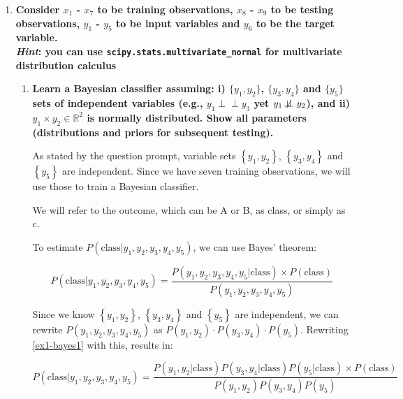 \documentclass[12pt]{article}
\newcommand{\ind}{\perp\!\!\!\perp}
\begin{document}
\begin{enumerate}[leftmargin=\labelsep]
  \item \textbf{Consider $x_1$ - $x_7$ to be training observations, $x_8$ - $x_9$ to be testing observations, $y_1$ - $y_5$ to be input
          variables and $y_6$ to be the target variable.\\
          \textit{Hint}: you can use \texttt{scipy.stats.multivariate\_normal} for multivariate distribution calculus}
        \begin{enumerate}
          \item \textbf{Learn a Bayesian classifier assuming: i) $\{y_1, y_2\}$, $\{y_3, y_4\}$ and $\{y_5\}$ sets of independent
                  variables (e.g., $y_1 \ind y_3$ yet $y_1 \not\!\ind y_2$), and ii) $y_1 \times y_2 \in \mathbb{R}^{2}$ is normally distributed. Show all
                  parameters (distributions and priors for subsequent testing).}

                \vskip 0.3cm
                As stated by the question prompt, variable sets \(\left\{y_1, y_2\right\}\), \(\left\{y_3, y_4\right\}\) and \(\left\{y_5\right\}\) are independent.
                Since we have seven training observations, we will use those to train a Bayesian classifier.

                We will refer to the outcome, which can be A or B, as class, or simply as c.

                To estimate $P(\text{class} | y_1, y_2, y_3, y_4, y_5)$, we can use Bayes' theorem:

                \begin{equation}\label{ex1-bayes1}
                  P(\text{class}| y_1, y_2, y_3, y_4, y_5) = \frac{P(y_1, y_2, y_3, y_4, y_5 | \text{class}) \times P(\text{class})}{P(y_1, y_2, y_3, y_4, y_5)}
                \end{equation}

                Since we know $\left\{y_1, y_2\right\}$, $\left\{y_3, y_4\right\}$ and $\left\{y_5\right\}$ are independent,
                we can rewrite $P(y_1, y_2, y_3, y_4, y_5)$ as $P(y_1, y_2) \cdot P(y_3, y_4) \cdot P(y_5)$.
                Rewriting \eqref{ex1-bayes1} with this, results in:

                \begin{equation}\label{ex1-bayes2}
                  P(\text{class}| y_1, y_2, y_3, y_4, y_5) = \frac{P(y_1, y_2 | \text{class}) P(y_3, y_4 | \text{class}) P(y_5 | \text{class}) \times P(\text{class})}{P(y_1, y_2)P(y_3, y_4)P(y_5)}
                \end{equation}


\end{enumerate}
\end{enumerate}
\end{document}
